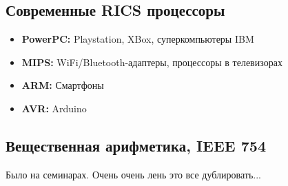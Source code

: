 \subsection{Современные RICS процессоры}

\begin{itemize}
	\item \textbf{PowerPC:} Playstation, XBox, суперкомпьютеры IBM
	\item \textbf{MIPS:} WiFi/Bluetooth-адаптеры, процессоры в телевизорах
	\item \textbf{ARM:} Смартфоны
	\item \textbf{AVR:} Arduino
\end{itemize}

\subsection{Вещественная арифметика, IEEE 754}

Было на семинарах. Очень очень лень это все дублировать...



